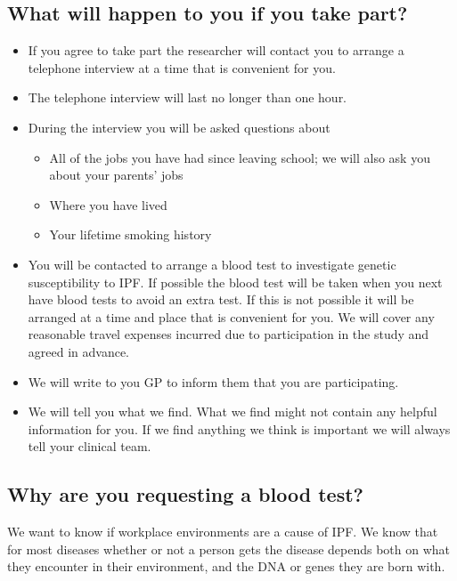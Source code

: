 \documentclass[a4paper,10pt]{article}
\begin{document}
\subsection*{What will happen to you if you take part?}
\begin{itemize}
 \item If you agree to take part the researcher will contact you to arrange a telephone interview at a time that is convenient for you.
 \item The telephone interview will last no longer than one hour.
 \item During the interview you will be asked questions about \begin{itemize}
                                                                \item All of the jobs you have had since leaving school; we will also ask you about your parents' jobs
                                                                \item Where you have lived 
                                                                \item Your lifetime smoking history
                                                               \end{itemize}
\item You will be contacted to arrange a blood test to investigate genetic susceptibility to IPF\@. If possible the blood test will be taken when you next have blood tests to avoid an extra test. If this is
not possible it will be arranged at a time and place that is convenient for you. We will cover any reasonable travel expenses incurred due to participation in the study and agreed in advance.
\item We will write to you GP to inform them that you are participating.
\item We will tell you what we find. What we find might not contain any helpful information for you. If we find anything we think is important we will always tell your clinical team.
\end{itemize}

\subsection*{Why are you requesting a blood test?}

We want to know if workplace environments are a cause of IPF. We know that for most diseases whether or not a person gets the disease depends both on what they encounter in their environment, and the DNA or genes they are born with.
\end{document}
